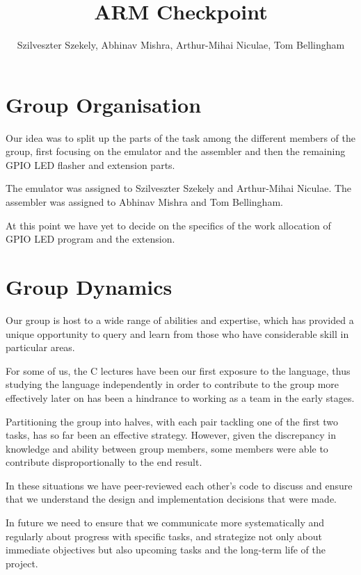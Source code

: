 \documentclass[11pt]{article}
\begin{document}
\title{ARM Checkpoint}
\author{
  Szilveszter Szekely,
  Abhinav Mishra,
  Arthur-Mihai Niculae,
  Tom Bellingham
}

\maketitle

\section{Group Organisation}

Our idea was to split up the parts of the task among the different members of
the group, first focusing on the emulator and the assembler and then the
remaining GPIO LED flasher and extension parts.

The emulator was assigned to Szilveszter Szekely and Arthur-Mihai Niculae.
The assembler was assigned to Abhinav Mishra and Tom Bellingham.

At this point we have yet to decide on the specifics of the work allocation of
GPIO LED program and the extension.

\section{Group Dynamics}

Our group is host to a wide range of abilities and expertise, which has provided
a unique opportunity to query and learn from those who have considerable skill
in particular areas.

For some of us, the C lectures have been our first exposure to the language,
thus studying the language independently in order to contribute to the group
more effectively later on has been a hindrance to working as a team in the early
stages.

Partitioning the group into halves, with each pair tackling one of the first two
tasks, has so far been an effective strategy. However, given the discrepancy in
knowledge and ability between group members, some members were able to
contribute disproportionally to the end result.

In these situations we have peer-reviewed each other's code to discuss and
ensure that we understand the design and implementation decisions that were
made.

In future we need to ensure that we communicate more systematically and
regularly about progress with specific tasks, and strategize not only about
immediate objectives but also upcoming tasks and the long-term life of the
project.
\end{document}
